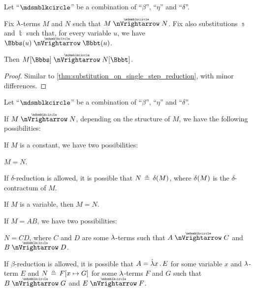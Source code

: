 \begin{proposition}\label{thm:substitution_on_parallel_reduction}
  Let \enquote{\( {\Anon} \)} be a combination of \enquote{\( \beta \)}, \enquote{\( \eta \)} and \enquote{\( \delta \)}.

  Fix \( {\mathrm \lambda} \)-terms \( M \) and \( N \) such that \( M \ppred N \). Fix also substitutions \( \Bbbs \) and \( \Bbbt \) such that, for every variable \( u \), we have \( \Bbbs(u) \ppred \Bbbt(u) \).

  Then \( M[\Bbbs] \ppred N[\Bbbt] \).
\end{proposition}
\begin{proof}
  Similar to \cref{thm:substitution_on_single_step_reduction}, with minor differences.
\end{proof}

\begin{lemma}\label{thm:parallel_reduction_deconstruction}
  Let \enquote{\( {\Anon} \)} be a combination of \enquote{\( \beta \)}, \enquote{\( \eta \)} and \enquote{\( \delta \)}.

  If \( M \ppred N \), depending on the structure of \( M \), we have the following possibilities:
  \begin{thmenum}
     If \( M \) is a constant, we have two possibilities:
    \begin{thmenum}
       \( M = N \).

       If \( \delta \)-reduction is allowed, it is possible that \( N \aequiv \op*{\delta}(M) \), where \( \op*{\delta}(M) \) is the \( \delta \)-contractum  of \( M \).
    \end{thmenum}

     If \( M \) is a variable, then \( M = N \).

     If \( M = AB \), we have two possibilities:
    \begin{thmenum}
       \( N = CD \), where \( C \) and \( D \) are some \( {\mathrm \lambda} \)-terms such that \( A \ppred C \) and \( B \ppred D \).

       If \( \beta \)-reduction is allowed, it is possible that \( A = \qabs x E \) for some variable \( x \) and \( {\mathrm \lambda} \)-term \( E \) and \( N \aequiv F[x \mapsto G] \) for some \( {\mathrm \lambda} \)-terms \( F \) and \( G \) such that \( B \ppred G \) and \( E \ppred F \).
    \end{thmenum}


\end{thmenum}
\end{lemma}
